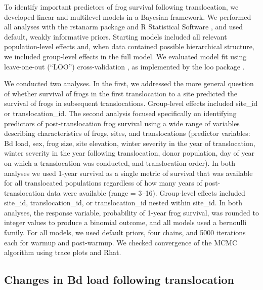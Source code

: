 \documentclass[9pt,twocolumn,twoside,lineno]{pnas-new}
\begin{document}
{To identify important predictors of frog survival following
translocation, we developed linear and multilevel models in a Bayesian
framework. We performed all analyses with the rstanarm package
\citep{rstanarm2022} and R Statistical Software
\citep[v4.4.4,][]{rsoftware2022}, and used default, weakly informative
priors. Starting models included all relevant population-level effects
and, when data contained possible hierarchical structure, we included
group-level effects in the full model. We evaluated model fit using
leave-one-out (``LOO'') cross-validation
\citep{gelman2013, gabry2019, vehtari2016}, as implemented by the loo
package \citep{vehtari2022}.

We conducted two analyses. In the first, we addressed the more general
question of whether survival of frogs in the first translocation to a
site predicted the survival of frogs in subsequent translocations.
Group-level effects included site\_id or translocation\_id. The second
analysis focused specifically on identifying predictors of
post-translocation frog survival using a wide range of variables
describing characteristics of frogs, sites, and translocations
(predictor variables: Bd load, sex, frog size, site elevation, winter
severity in the year of translocation, winter severity in the year
following translocation, donor population, day of year on which a
translocation was conducted, and translocation order). In both analyses
we used 1-year survival as a single metric of survival that was
available for all translocated populations regardless of how many years
of post-translocation data were available (range = 3--16). Group-level
effects included site\_id, translocation\_id, or translocation\_id
nested within site\_id. In both analyses, the response variable,
probability of 1-year frog survival, was rounded to integer values to
produce a binomial outcome, and all models used a bernoulli family. For
all models, we used default priors, four chains, and 5000 iterations
each for warmup and post-warmup. We checked convergence of the MCMC
algorithm using trace plots and Rhat.

\hypertarget{changes-in-bd-load-following-translocation}{%
\subsection*{Changes in Bd load following
translocation}\label{changes-in-bd-load-following-translocation}}

}
\end{document}
